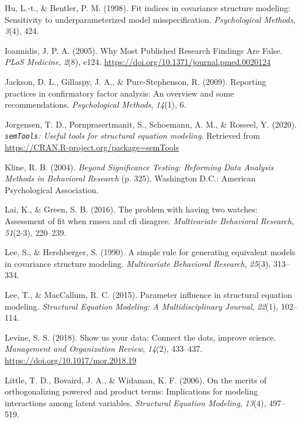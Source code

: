 \documentclass[
  english,
  man]{apa6}
\newlength{\cslhangindent}
\newenvironment{cslreferences}%
  {\setlength{\parindent}{0pt}%
  \everypar{\setlength{\hangindent}{\cslhangindent}}\ignorespaces}%
  {\par}
\begin{document}
\begin{cslreferences}
\leavevmode\hypertarget{ref-hu1998fit}{}%
Hu, L.-t., \& Bentler, P. M. (1998). Fit indices in covariance structure modeling: Sensitivity to underparameterized model misspecification. \emph{Psychological Methods}, \emph{3}(4), 424.

\leavevmode\hypertarget{ref-Ioannidis2005}{}%
Ioannidis, J. P. A. (2005). Why Most Published Research Findings Are False. \emph{PLoS Medicine}, \emph{2}(8), e124. \url{https://doi.org/10.1371/journal.pmed.0020124}

\leavevmode\hypertarget{ref-jackson2009reporting}{}%
Jackson, D. L., Gillaspy, J. A., \& Purc-Stephenson, R. (2009). Reporting practices in confirmatory factor analysis: An overview and some recommendations. \emph{Psychological Methods}, \emph{14}(1), 6.

\leavevmode\hypertarget{ref-semtools}{}%
Jorgensen, T. D., Pornprasertmanit, S., Schoemann, A. M., \& Rosseel, Y. (2020). \emph{\texttt{semTools}: Useful tools for structural equation modeling}. Retrieved from \url{https://CRAN.R-project.org/package=semTools}

\leavevmode\hypertarget{ref-Kline2004}{}%
Kline, R. B. (2004). \emph{Beyond Significance Testing: Reforming Data Analysis Methods in Behavioral Research} (p. 325). Washington D.C.: American Psychological Association.

\leavevmode\hypertarget{ref-lai2016problem}{}%
Lai, K., \& Green, S. B. (2016). The problem with having two watches: Assessment of fit when rmsea and cfi disagree. \emph{Multivariate Behavioral Research}, \emph{51}(2-3), 220--239.

\leavevmode\hypertarget{ref-Lee90}{}%
Lee, S., \& Hershberger, S. (1990). A simple rule for generating equivalent models in covariance structure modeling. \emph{Multivariate Behavioral Research}, \emph{25}(3), 313--334.

\leavevmode\hypertarget{ref-lee2015parameter}{}%
Lee, T., \& MacCallum, R. C. (2015). Parameter influence in structural equation modeling. \emph{Structural Equation Modeling: A Multidisciplinary Journal}, \emph{22}(1), 102--114.

\leavevmode\hypertarget{ref-Levine2018}{}%
Levine, S. S. (2018). Show us your data: Connect the dots, improve science. \emph{Management and Organization Review}, \emph{14}(2), 433--437. \url{https://doi.org/10.1017/mor.2018.19}

\leavevmode\hypertarget{ref-little2006merits}{}%
Little, T. D., Bovaird, J. A., \& Widaman, K. F. (2006). On the merits of orthogonalizing powered and product terms: Implications for modeling interactions among latent variables. \emph{Structural Equation Modeling}, \emph{13}(4), 497--519.


\end{cslreferences}
\end{document}
